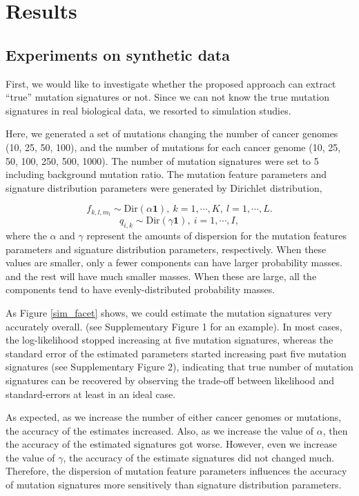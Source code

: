 \section*{Results}

\subsection*{Experiments on synthetic data}

First, we would like to investigate whether the proposed approach can extract ``true'' mutation signatures or not.
Since we can not know the true mutation signatures in real biological data, we resorted to simulation studies.

Here, we generated a set of mutations changing the number of cancer genomes (10, 25, 50, 100), 
and the number of mutations for each cancer genome (10, 25, 50, 100, 250, 500, 1000).
The number of mutation signatures were set to 5 including background mutation ratio.
The mutation feature parameters and signature distribution parameters were generated by Dirichlet distribution,

\begin{equation*}
 f_{k,l,m_l} \sim \text{Dir} (\alpha \bm{1} ),\ k = 1, \cdots, K,\  l = 1, \cdots, L.
\end{equation*}
 \begin{equation*}
 q_{i, k} \sim \text{Dir} (\gamma \bm{1} ),\ i = 1, \cdots, I,
 \end{equation*}
where the $\alpha$ and $\gamma$ represent the amounts of dispersion 
for the mutation features parameters and signature distribution parameters, respectively.
When these values are smaller, only a fewer components can have larger probability masses.
and the rest will have much smaller masses.  
When these are large, all the components tend to have evenly-distributed probability masses.
 
As Figure \ref{sim_facet} shows, we could estimate the mutation signatures very accurately overall.
(see Supplementary Figure 1 for an example).
In most cases, the log-likelihood stopped increasing at five mutation signatures, 
whereas the standard error of the estimated parameters started increasing past five mutation signatures (see Supplementary Figure 2),
indicating that true number of mutation signatures can be recovered by observing the trade-off between likelihood and standard-errors at least in an ideal case.

As expected, as we increase the number of either cancer genomes or mutations, the accuracy of the estimates increased.
Also, as we increase the value of $\alpha$, then the accuracy of the estimated signatures got worse.
However, even we increase the value of $\gamma$, the accuracy of the estimate signatures did not changed much.
Therefore, the dispersion of mutation feature parameters influences the accuracy of mutation signatures
more sensitively than signature distribution parameters.


